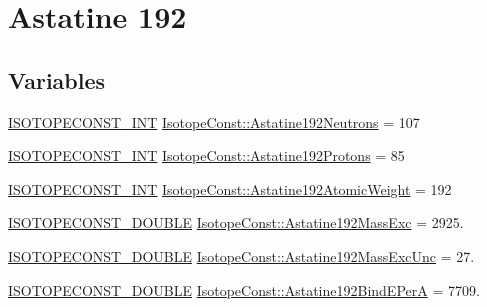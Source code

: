 \hypertarget{group___isotope_const-_astatine-_at192}{}\section{Astatine 192}
\label{group___isotope_const-_astatine-_at192}
\subsection*{Variables}
\begin{DoxyCompactItemize}
\item 
\mbox{\hyperlink{group___isotope_const-_macros_ga5f18360b3e99483a35c32d789e62621c}{I\+S\+O\+T\+O\+P\+E\+C\+O\+N\+S\+T\+\_\+\+I\+NT}} \mbox{\hyperlink{group___isotope_const-_astatine-_at192_ga120543c024221b772c65a693121fe3b9}{Isotope\+Const\+::\+Astatine192\+Neutrons}} = 107
\item 
\mbox{\hyperlink{group___isotope_const-_macros_ga5f18360b3e99483a35c32d789e62621c}{I\+S\+O\+T\+O\+P\+E\+C\+O\+N\+S\+T\+\_\+\+I\+NT}} \mbox{\hyperlink{group___isotope_const-_astatine-_at192_ga57aa26437bba584be81f94f541c949b1}{Isotope\+Const\+::\+Astatine192\+Protons}} = 85
\item 
\mbox{\hyperlink{group___isotope_const-_macros_ga5f18360b3e99483a35c32d789e62621c}{I\+S\+O\+T\+O\+P\+E\+C\+O\+N\+S\+T\+\_\+\+I\+NT}} \mbox{\hyperlink{group___isotope_const-_astatine-_at192_ga3ff79bf14a3b88201faba84a4178dc95}{Isotope\+Const\+::\+Astatine192\+Atomic\+Weight}} = 192
\item 
\mbox{\hyperlink{group___isotope_const-_macros_ga8f45a7272ce02c0b4c65c44636ed719a}{I\+S\+O\+T\+O\+P\+E\+C\+O\+N\+S\+T\+\_\+\+D\+O\+U\+B\+LE}} \mbox{\hyperlink{group___isotope_const-_astatine-_at192_ga4d2203a4685fb54bf816872d997e9677}{Isotope\+Const\+::\+Astatine192\+Mass\+Exc}} = 2925.
\item 
\mbox{\hyperlink{group___isotope_const-_macros_ga8f45a7272ce02c0b4c65c44636ed719a}{I\+S\+O\+T\+O\+P\+E\+C\+O\+N\+S\+T\+\_\+\+D\+O\+U\+B\+LE}} \mbox{\hyperlink{group___isotope_const-_astatine-_at192_ga68a9147926e025c6de60323b36f55998}{Isotope\+Const\+::\+Astatine192\+Mass\+Exc\+Unc}} = 27.
\item 
\mbox{\hyperlink{group___isotope_const-_macros_ga8f45a7272ce02c0b4c65c44636ed719a}{I\+S\+O\+T\+O\+P\+E\+C\+O\+N\+S\+T\+\_\+\+D\+O\+U\+B\+LE}} \mbox{\hyperlink{group___isotope_const-_astatine-_at192_ga198c5175dd4b0a5f46bcbb9a67f9a495}{Isotope\+Const\+::\+Astatine192\+Bind\+E\+PerA}} = 7709.
\item 

\end{DoxyCompactItemize}
